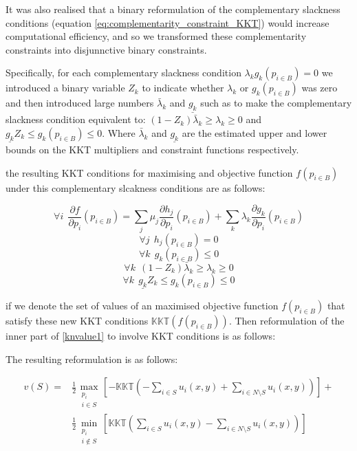 It was also realised that a binary reformulation of the complementary slackness conditions (equation \ref{eq:complementarity_constraint_KKT}) would increase computational efficiency, and so we transformed these complementarity constraints into disjunnctive binary constraints.

Specifically, for each complementary slackness condition $\lambda_kg_k(p_{i\in B}) = 0$ we introduced a binary variable $Z_k$ to indicate whether $\lambda_k$ or $g_k(p_{i\in B})$ was zero and then introduced large numbers $\bar{\lambda}_k$ and $ \underline{g_k} $ such as to make the complementary slackness condition equivalent to: $(1-Z_k)\bar{\lambda}_k \ge \lambda_k \ge 0$ and $\underline{g_k}Z_k\le g_k(p_{i\in B})\le 0$.
Where $\bar{\lambda}_k$ and $\underline{g_k}$ are the estimated upper and lower bounds on the KKT multipliers and constraint functions respectively.

the resulting KKT conditions for maximising and objective function $f(p_{i\in B})$ under this complementary slcakness conditions are as follows:

\begin{equation}\forall i~~\frac{\partial f}{\partial p_i}(p_{i\in B})=\sum_j\mu_j\frac{\partial h_j}{\partial p_i}(p_{i\in B}) + \sum_k\lambda_k\frac{\partial g_k}{\partial p_i}(p_{i\in B})\end{equation}
\begin{equation}\forall j~~ h_j(p_{i\in B})=0\end{equation}
\begin{equation}\forall k~~ g_k(p_{i\in B})\le 0\end{equation}
\begin{equation}\forall k~~ (1-Z_k)\bar{\lambda}_k \ge \lambda_k \ge 0\end{equation}
\begin{equation}\forall k~~ \underline{g_k}Z_k\le g_k(p_{i\in B}) \le 0\end{equation}

if we denote the set of values of an maximised objective function $f(p_{i\in B})$ that satisfy these new KKT conditions $\mathbb{KKT}(f(p_{i\in B}))$.
Then reformulation of the inner part of \eqref{knvalue1} to involve KKT conditions is as follows:

The resulting reformulation is as follows:

\begin{equation}
\label{optimization_eq1}
\begin{aligned}
v(S) =
&\frac{1}{2}\max_{\substack{p_i \\ i\in S}}   \left[-\mathbb{KKT}\left(-\sum_{i\in S} u_i(x,y) + \sum_{i\in N\setminus S}u_i(x,y)\right)\right] +\\
&\frac{1}{2}\min_{\substack{p_i \\ i\notin S}}\left[\mathbb{KKT}\left(\sum_{i\in S} u_i(x,y) - \sum_{i\in N\setminus S}u_i(x,y)\right)\right]
\end{aligned}
\end{equation}


